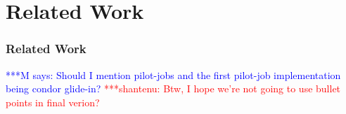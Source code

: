 \documentclass[times]{cpeauth}
\newcommand{\jhanote}[1]{ {\textcolor{red} { ***shantenu: #1 }}}
\newcommand{\mrnote}[1]{ {\textcolor{blue} { ***M says: #1 }}}
\newcommand{\pmnote}[1]{ {\textcolor{blue} { ***Pradeep: #1 }}}
\newcommand{\note}[1]{ {\textcolor{magenta} { ***Note: #1 }}}
\newcommand{\mrnote}[1]{}
\newcommand{\pmnote}[1]{}
\newcommand{\jhanote}[1]{}
\newcommand{\note}[1]{}
\begin{document}








\section{Related Work}


\subsubsection*{Related Work} 


\mrnote{Should I mention pilot-jobs and the first pilot-job implementation being condor glide-in?}
\jhanote{Btw, I hope we're not going to use bullet points in final verion?}
\end{document}
